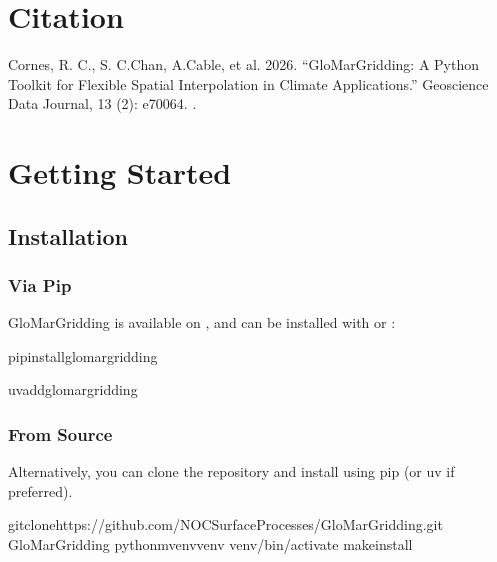 \documentclass[letterpaper,10pt,english]{sphinxmanual}
\begin{document}
\chapter{Citation}
\label{\detokenize{introduction:citation}}
\sphinxAtStartPar
Cornes, R. C., S. C.Chan, A.Cable, et al. 2026. “GloMarGridding: A Python Toolkit for Flexible
Spatial Interpolation in Climate Applications.” Geoscience Data Journal, 13 (2): e70064.
.

\sphinxstepscope


\chapter{Getting Started}
\label{\detokenize{getting_started:getting-started}}\label{\detokenize{getting_started::doc}}

\section{Installation}
\label{\detokenize{getting_started:installation}}

\subsection{Via Pip}
\label{\detokenize{getting_started:via-pip}}
\sphinxAtStartPar
GloMarGridding is available on , and can be
installed with  or :

\begin{sphinxVerbatim}[commandchars=\\\{\}]
pipinstallglomar\PYGZus{}gridding
\end{sphinxVerbatim}

\begin{sphinxVerbatim}[commandchars=\\\{\}]
uvaddglomar\PYGZus{}gridding
\end{sphinxVerbatim}


\subsection{From Source}
\label{\detokenize{getting_started:from-source}}
\sphinxAtStartPar
Alternatively, you can clone the repository and install using pip (or uv if preferred).

\begin{sphinxVerbatim}[commandchars=\\\{\}]
gitclonehttps://github.com/NOCSurfaceProcesses/GloMarGridding.git
GloMarGridding
python\PYGZhy{}mvenvvenv
venv/bin/activate
makeinstall
\end{sphinxVerbatim}
\end{document}
